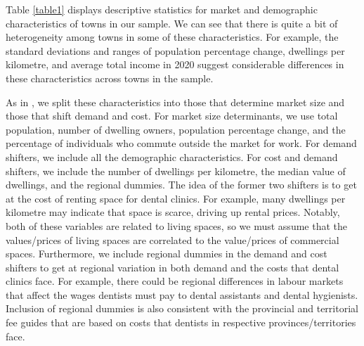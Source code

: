 \documentclass[a4paper,11pt]{article}
\begin{document}
Table \ref{table1} displays descriptive statistics for market and demographic characteristics of towns in our sample. We can see that there is quite a bit of heterogeneity among towns in some of these characteristics. For example, the standard deviations and ranges of population percentage change, dwellings per kilometre, and average total income in 2020 suggest considerable differences in these characteristics across towns in the sample.

As in \citet{BresReiss}, we split these characteristics into those that determine market size and those that shift demand and cost. For market size determinants, we use total population, number of dwelling owners, population percentage change, and the percentage of individuals who commute outside the market for work. For demand shifters, we include all the demographic characteristics. For cost and demand shifters, we include the number of dwellings per kilometre, the median value of dwellings, and the regional dummies. The idea of the former two shifters is to get at the cost of renting space for dental clinics. For example, many dwellings per kilometre may indicate that space is scarce, driving up rental prices. Notably, both of these variables are related to living spaces, so we must assume that the values/prices of living spaces are correlated to the value/prices of commercial spaces. Furthermore, we include regional dummies in the demand and cost shifters to get at regional variation in both demand and the costs that dental clinics face. For example, there could be regional differences in labour markets that affect the wages dentists must pay to dental assistants and dental hygienists. Inclusion of regional dummies is also consistent with the provincial and territorial fee guides that are based on costs that dentists in respective provinces/territories face.
\end{document}
